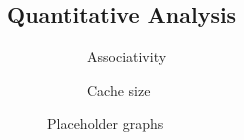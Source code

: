 


\subsection{Quantitative Analysis}

\begin{figure}[ht]
     \centering
     \begin{subfigure}[b]{0.45\textwidth}
         \centering
         \caption{Associativity}
         \label{fig:associativity}
     \end{subfigure}
     \hfill
     \begin{subfigure}[b]{0.45\textwidth}
         \centering
         \caption{Cache size}
         \label{fig:cache_size}
     \end{subfigure}
     \hfill
        \caption{Placeholder graphs}
        \label{fig:placeholder}
\end{figure}


